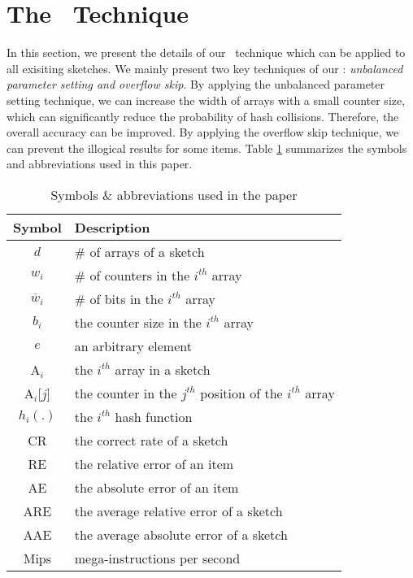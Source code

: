 \presec
\section{The \fname~Technique} \postsec

In this section, we present the details of our \fname~technique which can be applied to all exisiting sketches.
We mainly present two key techniques of our \fname: \textit{unbalanced parameter setting and overflow skip}.
By applying the unbalanced parameter setting technique, we can increase the width of arrays with a small counter size, which can significantly reduce the probability of hash collisions.
Therefore, the overall accuracy can be improved. %
By applying the overflow skip technique, we can prevent the illogical results for some items.
Table \ref{table:symbols} summarizes the symbols and abbreviations used in this paper.

\begin{table}[htbp]
	\centering
	\caption{Symbols \& abbreviations used in the paper}
	\begin{tabular}{|c|l|}
		\hline
		\textbf{Symbol}&\textbf{Description}\\
		\hline
		$d$& \# of arrays of a sketch\\
		\hline
		$w_i$& \# of counters in the $i^{th}$ array\\
		\hline
		$\overline{w}_i$& \# of bits in the $i^{th}$ array\\
		\hline
		$b_i$& the counter size in the $i^{th}$ array\\
		\hline
		$e$& an arbitrary element\\
		\hline
		A$_i$& the $i^{th}$ array in a sketch\\
		\hline
		A$_i$[$j$]& the counter in the $j^{th}$ position of the $i^{th}$ array\\
		\hline
		$h_i(.)$& the $i^{th}$ hash function\\
		\hline
		CR& the correct rate of a sketch\\
		\hline
		RE& the relative error of an item\\
		\hline
		AE& the absolute error of an item\\
		\hline
		ARE& the average relative error of a sketch\\
		\hline
		AAE& the average absolute error of a sketch\\
		\hline
		Mips& mega-instructions per second\\
		\hline
	\end{tabular} 
	\label{table:symbols}
\end{table}

